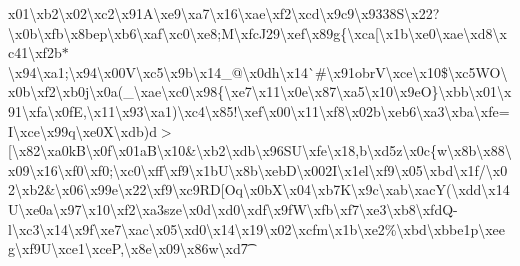 {}x01\textbackslash{}xb2\textbackslash{}x02\textbackslash{}xc2\textbackslash{}x91\+A\textbackslash{}xe9\textbackslash{}xa7\textbackslash{}x16\textbackslash{}xae\textquotesingle{}\textbackslash{}xf2\textbackslash{}xcd\textbackslash{}x9c9\textbackslash{}x9338\+S\textbackslash{}x22?\textbackslash{}x0b\textbackslash{}xfb\textbackslash{}x8bep\textbackslash{}xb6\textbackslash{}xaf\textbackslash{}xc0\textbackslash{}xe8;\+M\textbackslash{}xfc\+J29\textbackslash{}xef\textbackslash{}x89g\{\textbackslash{}xca\mbox{[}\textbackslash{}x1b\textbackslash{}xe0\textbackslash{}xae\textbackslash{}xd8\textbackslash{}xc41\textbackslash{}xf2b$\ast$\textbackslash{}x94\textbackslash{}xa1;\textbackslash{}x94\textbackslash{}x00\+V\textbackslash{}xc5\textbackslash{}x9b\textbackslash{}x14\+\_\+@\textbackslash{}x0dh\textbackslash{}x14\`{}\#\textbackslash{}x91obr\+V\textbackslash{}xce\textbackslash{}x10\$\textbackslash{}xc5\+W\+O\textbackslash{}x0b\textbackslash{}xf2\textbackslash{}xb0j\textbackslash{}x0a(\+\_\+\textbackslash{}xae\textbackslash{}xc0\textbackslash{}x98\{\textbackslash{}xe7\textbackslash{}x11\textbackslash{}x0e\textbackslash{}x87\textbackslash{}xa5\textbackslash{}x10\textbackslash{}x9e\+O\}\textbackslash{}xbb\textbackslash{}x01\textbackslash{}x91\textbackslash{}xfa\textbackslash{}x0f\+E,\textbackslash{}x11\textbackslash{}x93\textbackslash{}xa1)\textbackslash{}xc4\textbackslash{}x85!\textbackslash{}xef\textbackslash{}x00\textbackslash{}x11\textbackslash{}xf8\textbackslash{}x02b\textbackslash{}xeb6\textbackslash{}xa3\textbackslash{}xba\textbackslash{}xfe=\+I\textbackslash{}xce\textbackslash{}x99q\textbackslash{}xe0\+X\textbackslash{}xdb)d$>$\mbox{[}\textbackslash{}x82\textbackslash{}xa0k\+B\textbackslash{}x0f\textbackslash{}x01a\+B\textbackslash{}x10\&\textbackslash{}xb2\textbackslash{}xdb\textbackslash{}x96\+S\+U\textbackslash{}xfe\textbackslash{}x18,b\textbackslash{}xd5z\textbackslash{}x0c\{w\textbackslash{}x8b\textbackslash{}x88\textbackslash{}x09\textbackslash{}x16\textbackslash{}xf0\textbackslash{}xf0;\textbackslash{}xc0\textbackslash{}xff\textbackslash{}xf9\textbackslash{}x1b\+U\textbackslash{}x8b\textbackslash{}xeb\+D\textbackslash{}x002\+I\textbackslash{}x1el\textbackslash{}xf9\textbackslash{}x05\textbackslash{}xbd\textbackslash{}x1f/\textbackslash{}x02\textbackslash{}xb2\&\textbackslash{}x06\textbackslash{}x99e\textbackslash{}x22\textbackslash{}xf9\textbackslash{}xc9\+R\+D\mbox{[}\+Oq\textbackslash{}x0b\+X\textbackslash{}x04\textbackslash{}xb7\+K\textbackslash{}x9c\textbackslash{}xab\textbackslash{}xac\+Y(\textbackslash{}xdd\textbackslash{}x14\+U\textbackslash{}xe0a\textbackslash{}x97\textbackslash{}x10\textbackslash{}xf2\textbackslash{}xa3sze\textbackslash{}x0d\textbackslash{}xd0\textbackslash{}xdf\textquotesingle{}\textbackslash{}x9f\+W\textbackslash{}xfb\textbackslash{}xf7\textbackslash{}xe3\textbackslash{}xb8\textbackslash{}xfd\+Q-\/l\textbackslash{}xc3\textbackslash{}x14\textbackslash{}x9f\textbackslash{}xe7\textbackslash{}xac\textbackslash{}x05\textbackslash{}xd0\textbackslash{}x14\textbackslash{}x19\textbackslash{}x02\textbackslash{}xcfm\textbackslash{}x1b\textbackslash{}xe2\%\textbackslash{}xbd\textbackslash{}xbbe1p\textbackslash{}xeeg\textbackslash{}xf9\+U\textbackslash{}xce1\textbackslash{}xce\+P,\textbackslash{}x8e\textbackslash{}x09\textbackslash{}x86w\textbackslash{}xd7\t
